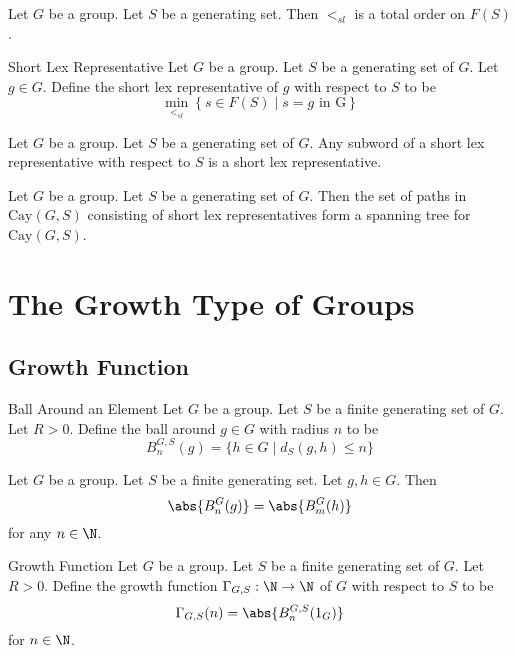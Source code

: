 \documentclass[a4paper]{article}
\begin{document}
\begin{lmm}{}{} Let $G$ be a group. Let $S$ be a generating set. Then $<_{sl}$ is a total order on $F(S)$. 
\end{lmm}

\begin{defn}{Short Lex Representative}{} Let $G$ be a group. Let $S$ be a generating set of $G$. Let $g\in G$. Define the short lex representative of $g$ with respect to $S$ to be $$\min_{<_{sl}}\left\{s\in F(S)\;|\;s=g\text{ in G}\right\}$$
\end{defn}

\begin{lmm}{}{} Let $G$ be a group. Let $S$ be a generating set of $G$. Any subword of a short lex representative with respect to $S$ is a short lex representative. 
\end{lmm}

\begin{crl}{}{} Let $G$ be a group. Let $S$ be a generating set of $G$. Then the set of paths in $\text{Cay}(G,S)$ consisting of short lex representatives form a spanning tree for $\text{Cay}(G,S)$. 
\end{crl}

\pagebreak
\section{The Growth Type of Groups}
\subsection{Growth Function}
\begin{defn}{Ball Around an Element}{} Let $G$ be a group. Let $S$ be a finite generating set of $G$. Let $R>0$. Define the ball around $g\in G$ with radius $n$ to be $$B_n^{G,S}(g)=\{h\in G\;|\;d_S(g,h)\leq n\}$$
\end{defn}

\begin{prp}{}{} Let $G$ be a group. Let $S$ be a finite generating set. Let $g,h\in G$. Then $$\abs{B_n^G(g)}=\abs{B_m^G(h)}$$ for any $n\in\N$. 
\end{prp}

\begin{defn}{Growth Function}{} Let $G$ be a group. Let $S$ be a finite generating set of $G$. Let $R>0$. Define the growth function $\Gamma_{G,S}:\N\to\N$ of $G$ with respect to $S$ to be $$\Gamma_{G,S}(n)=\abs{B_n^{G,S}(1_G)}$$ for $n\in\N$. 
\end{defn}
\end{document}
